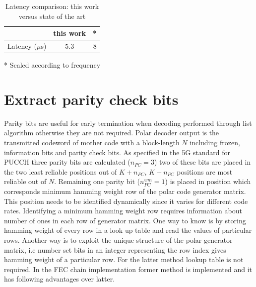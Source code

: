 \begin{table}[!h]
		\begin{center}
		\caption{Latency comparison: this work versus state of the art \cite{lowLatencySWPolarDec}}
		\label{tab:decoderLatencyStateofTheART}
		\begin{threeparttable}
		\begin{tabular}{c|c|c} %
			\textbf{ } & this work & \cite{lowLatencySWPolarDec}* \\
			\hline
			Latency ($\mu$s) & $5.3$ & $8$\\
			\hline
		\end{tabular}
	\begin{tablenotes}\footnotesize
		\item[*] Scaled according to frequency
	\end{tablenotes}
	\end{threeparttable}
	\end{center}
\end{table}

\section{Extract parity check bits}
Parity bits are useful for early termination when decoding performed through list algorithm otherwise they are not required. Polar decoder output is the transmitted codeword of mother code with a block-length $N$ including frozen, information bits and parity check bits. As specified in the 5G standard \cite{3gpp.38.212} for PUCCH three parity bits are calculated ($n_{PC} = 3$) two of these bits are placed in the two least reliable positions out of $K+n_{PC}$, $K+n_{PC}$ positions are most reliable out of $N$. Remaining one parity bit ($ n_{PC}^{wm} = 1 $) is placed in position which corresponds minimum hamming weight row of the polar code generator matrix. This position needs to be identified dynamically since it varies for different code rates. Identifying a minimum hamming weight row requires information about number of ones in each row of generator matrix. One way to know is by storing hamming weight of every row in a look up table and read the values of particular rows. Another way is to exploit the unique structure of the polar generator matrix, i.e number set bits in an integer representing the row index gives hamming weight of a particular row. For the latter method lookup table is not required. In the FEC chain implementation former method is implemented and it has following advantages over latter.

